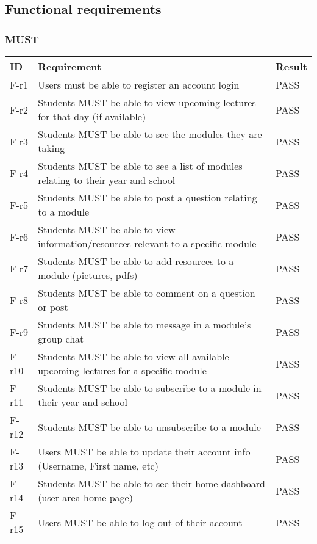 \subsection{Functional requirements}
\subsubsection{MUST}

\begin{tabular}{|p{1cm}|p{10cm}|p{3cm}|}
    \hline
        \textbf{ID} & \textbf{Requirement} & \textbf{Result} \\
    \hline
    F-r1 &
    Users must be able to register an account login & 
    PASS \\
    \hline
    F-r2 & 
    Students MUST be able to view upcoming lectures for that day (if available) & 
    PASS \\
    \hline
    F-r3 &
    Students MUST be able to see the modules they are taking &
    PASS \\
    \hline
    F-r4 &
    Students MUST be able to see a list of modules relating to their year and school &
    PASS \\
    \hline
    F-r5 &
    Students MUST be able to post a question relating to a module &
    PASS \\
    \hline
    F-r6 &
    Students MUST be able to view information/resources relevant to a specific module &
    PASS \\
    \hline
    F-r7 &
    Students MUST be able to add resources to a module (pictures, pdfs) &
    PASS \\
    \hline
    F-r8 &
    Students MUST be able to comment on a question or post &
    PASS \\
    \hline
    F-r9 &
    Students MUST be able to message in a module’s group chat &
    PASS \\
    \hline
    F-r10 &
    Students MUST be able to view all available upcoming lectures for a specific module &
    PASS \\
    \hline
    F-r11 &
    Students MUST be able to subscribe to a module in their year and school &
    PASS \\
    \hline
    F-r12 &
    Students MUST be able to unsubscribe to a module &
    PASS \\
    \hline
    F-r13 &
    Users MUST be able to update their account info (Username, First name, etc) &
    PASS \\
    \hline
    F-r14 &
    Students MUST be able to see their home dashboard (user area home page) &
    PASS \\
    \hline
    F-r15 &
    Users MUST be able to log out of their account &
    PASS \\
    \hline
\end{tabular}

